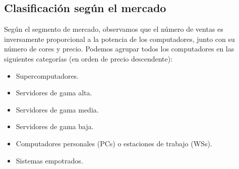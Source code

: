 \subsection{Clasificación según el mercado}
Según el segmento de mercado, observamos que el número de ventas es inversamente proporcional a la potencia de los computadores, junto con su número de cores y precio. Podemos agrupar todos los computadores en las siguientes categorías (en orden de precio descendente):
\begin{itemize}
    \item Supercomputadores.
    \item Servidores de gama alta.
    \item Servidores de gama media.
    \item Servidores de gama baja.
    \item Computadores personales (PCs) o estaciones de trabajo (WSs).
    \item Sistemas empotrados.
\end{itemize}

